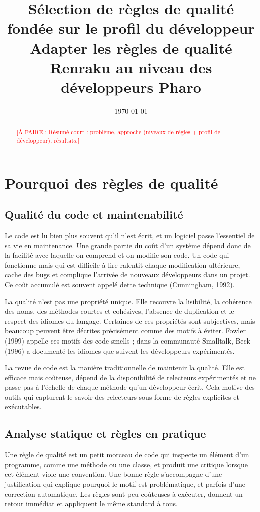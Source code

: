 \documentclass[11pt,a4paper]{report}
\title{Sélection de règles de qualité fondée sur le profil du développeur\\
\large Adapter les règles de qualité Renraku au niveau des développeurs Pharo}
\author{\todo{Nom}}
\date{\today}
\newcommand{\todo}[1]{\textcolor{red}{[À FAIRE : #1]}}
\begin{document}
\maketitle
\tableofcontents

\begin{abstract}
\todo{Résumé court : problème, approche (niveaux de règles + profil de développeur), résultats.}

\end{abstract}

\chapter{Pourquoi des règles de qualité}
\section{Qualité du code et maintenabilité}
Le code est lu bien plus souvent qu’il n’est écrit, et un logiciel passe l’essentiel de sa vie en maintenance. Une grande partie du coût d’un système dépend donc de la facilité avec laquelle on comprend et on modifie son code. Un code qui fonctionne mais qui est difficile à lire ralentit chaque modification ultérieure, cache des bugs et complique l’arrivée de nouveaux développeurs dans un projet. Ce coût accumulé est souvent appelé dette technique (Cunningham, 1992).

La qualité n’est pas une propriété unique. Elle recouvre la lisibilité, la cohérence des noms, des méthodes courtes et cohésives, l’absence de duplication et le respect des idiomes du langage. Certaines de ces propriétés sont subjectives, mais beaucoup peuvent être décrites précisément comme des motifs à éviter. Fowler (1999) appelle ces motifs des code smells ; dans la communauté Smalltalk, Beck (1996) a documenté les idiomes que suivent les développeurs expérimentés.

La revue de code est la manière traditionnelle de maintenir la qualité. Elle est efficace mais coûteuse, dépend de la disponibilité de relecteurs expérimentés et ne passe pas à l’échelle de chaque méthode qu’un développeur écrit. Cela motive des outils qui capturent le savoir des relecteurs sous forme de règles explicites et exécutables.

\section{Analyse statique et règles en pratique}
Une règle de qualité est un petit morceau de code qui inspecte un élément d’un programme, comme une méthode ou une classe, et produit une critique lorsque cet élément viole une convention. Une bonne règle s’accompagne d’une justification qui explique pourquoi le motif est problématique, et parfois d’une correction automatique. Les règles sont peu coûteuses à exécuter, donnent un retour immédiat et appliquent le même standard à tous.
\end{document}

